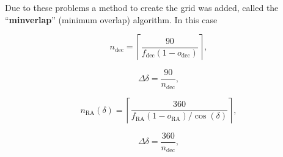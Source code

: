 \begin{colsection}
\begin{colsection}
Due to these problems a method to create the grid was added, called the ``\textbf{minverlap}'' (minimum overlap) algorithm. In this case


\begin{equation}
    n_\text{dec} = \left \lceil \frac{90}{f_\text{dec}(1-o_\text{dec})} \right \rceil,
    \label{eq:minverlap_ndec}
\end{equation}


\begin{equation}
    \Delta\delta = \frac{90}{n_\text{dec}},
    \label{eq:minverlap_deltadelta}
\end{equation}


\begin{equation}
    n_\text{RA}(\delta) = \left \lceil \frac{360}{f_\text{RA}(1-o_\text{RA})/\cos(\delta)} \right \rceil,
    \label{eq:minverlap_nra}
\end{equation}


\begin{equation}
    \Delta\delta = \frac{360}{n_\text{dec}},
    \label{eq:minverlap_deltaalpha}
\end{equation}





\end{colsection}
\end{colsection}
